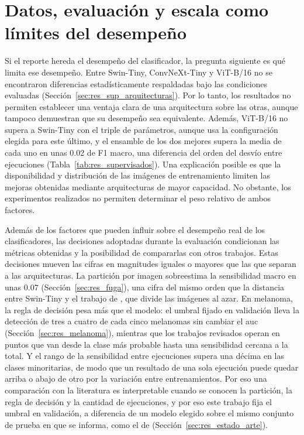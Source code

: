 \section{Datos, evaluación y escala como límites del desempeño}
\label{sec:disc_limites}

Si el reporte hereda el desempeño del clasificador, la pregunta siguiente es qué limita ese desempeño. Entre Swin-Tiny, ConvNeXt-Tiny y ViT-B/16 no se encontraron diferencias estadísticamente respaldadas bajo las condiciones evaluadas (Sección~\ref{sec:res_sup_arquitecturas}). Por lo tanto, los resultados no permiten establecer una ventaja clara de una arquitectura sobre las otras, aunque tampoco demuestran que su desempeño sea equivalente. Además, ViT-B/16 no supera a Swin-Tiny con el triple de parámetros, aunque usa la configuración elegida para este último, y el ensamble de los dos mejores supera la media de cada uno en unas 0.02 de F1 macro, una diferencia del orden del desvío entre ejecuciones (Tabla~\ref{tab:res_supervisados}). Una explicación posible es que la disponibilidad y distribución de las imágenes de entrenamiento limiten las mejoras obtenidas mediante arquitecturas de mayor capacidad. No obstante, los experimentos realizados no permiten determinar el peso relativo de ambos factores.

Además de los factores que pueden influir sobre el desempeño real de los clasificadores, las decisiones adoptadas durante la evaluación condicionan las métricas obtenidas y la posibilidad de compararlas con otros trabajos. Estas decisiones mueven las cifras en magnitudes iguales o mayores que las que separan a las arquitecturas. La partición por imagen sobreestima la sensibilidad macro en unas 0.07 (Sección~\ref{sec:res_fuga}),
una cifra del mismo orden que la distancia entre Swin-Tiny y el trabajo de \textcite{kim2025skinsavvy2}, que divide las
imágenes al azar. En melanoma, la regla de decisión pesa más que el modelo: el umbral fijado en validación lleva la
detección de tres a cuatro de cada cinco melanomas sin cambiar el \gls{auc} (Sección~\ref{sec:res_melanoma}), mientras
que los trabajos revisados operan en puntos que van desde la clase más probable hasta una sensibilidad cercana a la
total. Y el rango de la sensibilidad entre ejecuciones supera una décima en las clases minoritarias, de modo que un resultado de una
sola ejecución puede quedar arriba o abajo de otro por la variación entre entrenamientos. Por eso una comparación con la literatura es interpretable cuando se conocen la partición, la regla de decisión y la cantidad de ejecuciones, y por eso este trabajo fija el
umbral en validación, a diferencia de un modelo elegido sobre el mismo conjunto de prueba en que se informa, como el de
\textcite{yao2022single} (Sección~\ref{sec:res_estado_arte}).

